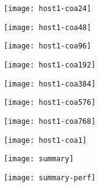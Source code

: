 \begin{frame}[plain]{}{}
	\begin{center} 
		\texttt{[image: host1-coa24]}
	\end{center} 
\end{frame}

\begin{frame}[plain]{}{}
	\begin{center} 
		\texttt{[image: host1-coa48]}
	\end{center} 
\end{frame}

\begin{frame}[plain]{}{}
	\begin{center} 
		\texttt{[image: host1-coa96]}
	\end{center} 
\end{frame}

\begin{frame}[plain]{}{}
	\begin{center} 
		\texttt{[image: host1-coa192]}
	\end{center} 
\end{frame}

\begin{frame}[plain]{}{}
	\begin{center} 
		\texttt{[image: host1-coa384]}
	\end{center} 
\end{frame}

\begin{frame}[plain]{}{}
	\begin{center} 
		\texttt{[image: host1-coa576]}
	\end{center} 
\end{frame}

\begin{frame}[plain]{}{}
	\begin{center} 
		\texttt{[image: host1-coa768]}
	\end{center} 
\end{frame}

\begin{frame}[plain]{}{}
	\begin{center} 
		\texttt{[image: host1-coa1]}
	\end{center} 
\end{frame}


\begin{frame}[plain]{}{}
	\begin{center} 
		\texttt{[image: summary]}
	\end{center} 
\end{frame}


\begin{frame}[plain]{}{}
	\begin{center} 
		\texttt{[image: summary-perf]}
	\end{center} 
\end{frame}